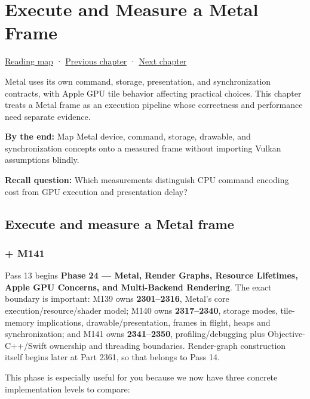 \chapter{Execute and Measure a Metal Frame}\label{01-foundations-i-ch015-execute-and-measure-a-metal-frame}\hypertarget{01-foundations-i-ch015}{}\label{stagechapter:01-foundations-i-ch015}

\hyperref[volume-reading-map]{Reading map} · \hyperref[01-foundations-i-ch014-submit-synchronize-and-retire-gpu-work]{Previous chapter} · \hyperref[01-foundations-i-ch016-profile-gpus-and-respect-apple-ownership-boundaries]{Next chapter}

Metal uses its own command, storage, presentation, and synchronization contracts, with Apple GPU tile behavior affecting practical choices. This chapter treats a Metal frame as an execution pipeline whose correctness and performance need separate evidence.

\textbf{By the end:} Map Metal device, command, storage, drawable, and synchronization concepts onto a measured frame without importing Vulkan assumptions blindly.

\textbf{Recall question:} Which measurements distinguish CPU command encoding cost from GPU execution and presentation delay?

\section{Execute and measure a Metal frame}\label{01-foundations-i-ch015-execute-and-measure-a-metal-frame-1}

\subsection{+ M141}\label{01-foundations-i-ch015-m141}

Pass 13 begins \textbf{Phase 24 --- Metal, Render Graphs, Resource Lifetimes, Apple GPU Concerns, and Multi-Backend Rendering}. The exact boundary is important: M139 owns \textbf{2301--2316}, Metal's core execution/resource/shader model; M140 owns \textbf{2317--2340}, storage modes, tile-memory implications, drawable/presentation, frames in flight, heaps and synchronization; and M141 owns \textbf{2341--2350}, profiling/debugging plus Objective-C++/Swift ownership and threading boundaries. Render-graph construction itself begins later at Part 2361, so that belongs to Pass 14.

This phase is especially useful for you because we now have three concrete implementation levels to compare:

